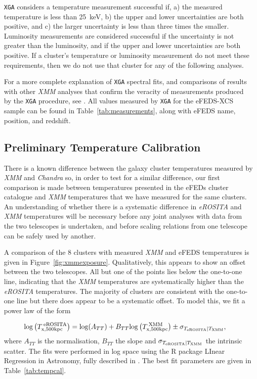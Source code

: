 \documentclass[fleqn,usenatbib]{mnras}
\begin{document}
\texttt{XGA} considers a temperature measurement successful if, a) the measured temperature is less than 25~keV, b) the upper and lower uncertainties are both positive, and c) the larger uncertainty is less than three times the smaller. Luminosity measurements are considered successful if the uncertainty is not greater than the luminosity, and if the upper and lower uncertainties are both positive. If a cluster's temperature or luminosity measurement do not meet these requirements, then we do not use that cluster for any of the following analyses.

For a more complete explanation of \texttt{XGA} spectral fits, and comparisons of results with other {\em XMM} analyses that confirm the veracity of measurements produced by the \texttt{XGA} procedure, see \cite{xcsmassmethod}. All values measured by \texttt{XGA} for the eFEDS-XCS sample can be found in Table~\ref{tab:measurements}, along with eFEDS name, position, and redshift.

\subsection{Preliminary Temperature Calibration}
\label{subsec:tcal}
There is a known difference between the galaxy cluster temperatures measured by {\em XMM} and {\em Chandra} so, in order to test for a similar difference, our first comparison is made between temperatures presented in the eFEDs cluster catalogue and {\em XMM} temperatures that we have measured for the same clusters. An understanding of whether there is a systematic difference in {\em eROSITA} and {\em XMM} temperatures will be necessary before any joint analyses with data from the two telescopes is undertaken, and before scaling relations from one telescope can be safely used by another.

A comparison of the 8 clusters with measured {\em XMM} and eFEDS temperatures is given in Figure~\ref{fig:xmmexposure}.  Qualitatively, this appears to show an offset between the two telescopes.  All but one of the points lies below the one-to-one line, indicating that the {\em XMM} temperatures are systematically higher than the {\em eROSITA} temperatures. The majority of clusters are consistent with the one-to-one line but there does appear to be a systematic offset. To model this, we fit a power law of the form

\begin{align}
{\rm log}\left(T^{\:\rm{eROSITA}}_{\rm{x, 500kpc}}\right) &= {\rm log}(A_{TT}) + B_{TT}{\rm log}\left(T^{\:\rm{XMM}}_{\rm{x, 500kpc}}\right) \pm \sigma_{T_{\rm{eROSITA}}|T_{\rm{XMM}}},
\label{equ:TvsT}
\end{align}
where $A_{TT}$ is the normalisation, $B_{TT}$ the slope and $\sigma_{T_{\rm{eROSITA}}|T_{\rm{XMM}}}$ the intrinsic scatter. The fits were performed in log space using the R package LInear Regression in Astronomy\citep[{\sc lira}\footnote{\href{https://cran.r-project.org/web/packages/lira/index.html}{LInear Regression in Astronomy}}, ][]{softlira}, fully described in \cite{LIRA}. The best fit parameters are given in Table~\ref{tab:tempcal}. 
\end{document}
